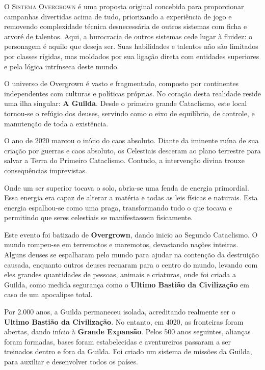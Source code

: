 
\lettrine[lines=3, lhang=0.1, findent=2pt]{\ringmfamily O}{ Sistema Overgrown} é uma proposta original concebida para proporcionar campanhas divertidas acima de tudo, priorizando a experiência de jogo e removendo complexidade técnica desnecessária de outros sistemas com ficha e arvoré de talentos. Aqui, a burocracia de outros sistemas cede lugar à fluidez: o personagem é aquilo que deseja ser. Suas habilidades e talentos não são limitados por classes rígidas, mas moldados por sua ligação direta com entidades superiores e pela lógica intrínseca deste mundo.

O universo de Overgrown é vasto e fragmentado, composto por continentes independentes com culturas e políticas próprias. No coração desta realidade reside uma ilha singular: \textbf{A Guilda}. Desde o primeiro grande Cataclismo, este local tornou-se o refúgio dos deuses, servindo como o eixo de equilíbrio, de controle, e manutenção de toda a existência.

O ano de 2020 marcou o início do caos absoluto. Diante da iminente ruína de sua criação por guerras e caos absoluto, os Celestiais desceram ao plano terrestre para salvar a Terra do Primeiro Cataclismo. Contudo, a intervenção divina trouxe consequências imprevistas. 

Onde um ser superior tocava o solo, abria-se uma fenda de energia primordial. Essa energia era capaz de alterar a matéria e todas as leis físicas e naturais. Esta energia espalhou-se como uma praga, transformando tudo o que tocava e permitindo que seres celestiais se manifestassem fisicamente. 

Este evento foi batizado de \textbf{Overgrown}, dando inicio ao Segundo Cataclismo. O mundo rompeu-se em terremotos e maremotos, devastando nações inteiras. Alguns deuses se espalharam pelo mundo para ajudar na contenção da destruição causada, enquanto outros deuses recuaram para o centro do mundo, levando com eles grandes quantidades de pessoas, animais e criaturas, onde foi criada a Guilda, como medida segurança como o \textbf{Ultimo Bastião da Civilização} em caso de um apocalipse total.


Por 2.000 anos, a Guilda permaneceu isolada, acreditando realmente ser o \textbf{Ultimo Bastião da Civilização}. No entanto, em 4020, as fronteiras foram abertas, dando início à \textbf{Grande Expansão}. Pelos 500 anos seguintes, alianças foram formadas, bases foram estabelecidas e aventureiros passaram a ser treinados dentro e fora da Guilda. Foi criado um sistema de missões da Guilda, para auxiliar e desenvolver todos os países.

